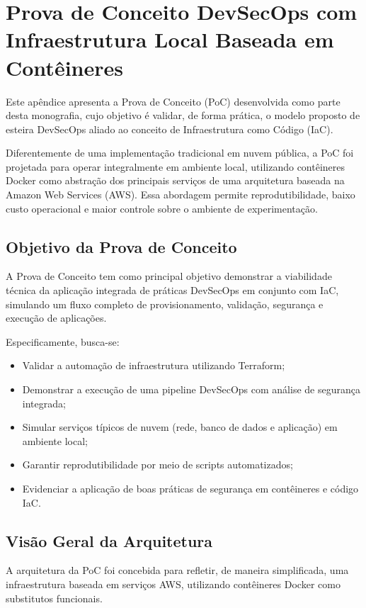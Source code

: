 \chapter{Prova de Conceito DevSecOps com Infraestrutura Local Baseada em Contêineres}
\label{apendice:poc-devsecops}

Este apêndice apresenta a Prova de Conceito (PoC) desenvolvida como parte desta monografia, cujo objetivo é validar, de forma prática, o modelo proposto de esteira DevSecOps aliado ao conceito de Infraestrutura como Código (IaC).

Diferentemente de uma implementação tradicional em nuvem pública, a PoC foi projetada para operar integralmente em ambiente local, utilizando contêineres Docker como abstração dos principais serviços de uma arquitetura baseada na Amazon Web Services (AWS). Essa abordagem permite reprodutibilidade, baixo custo operacional e maior controle sobre o ambiente de experimentação.

\section{Objetivo da Prova de Conceito}

A Prova de Conceito tem como principal objetivo demonstrar a viabilidade técnica da aplicação integrada de práticas DevSecOps em conjunto com IaC, simulando um fluxo completo de provisionamento, validação, segurança e execução de aplicações.

Especificamente, busca-se:

\begin{itemize}
\item Validar a automação de infraestrutura utilizando Terraform;
\item Demonstrar a execução de uma pipeline DevSecOps com análise de segurança integrada;
\item Simular serviços típicos de nuvem (rede, banco de dados e aplicação) em ambiente local;
\item Garantir reprodutibilidade por meio de scripts automatizados;
\item Evidenciar a aplicação de boas práticas de segurança em contêineres e código IaC.
\end{itemize}

\section{Visão Geral da Arquitetura}

A arquitetura da PoC foi concebida para refletir, de maneira simplificada, uma infraestrutura baseada em serviços AWS, utilizando contêineres Docker como substitutos funcionais.

